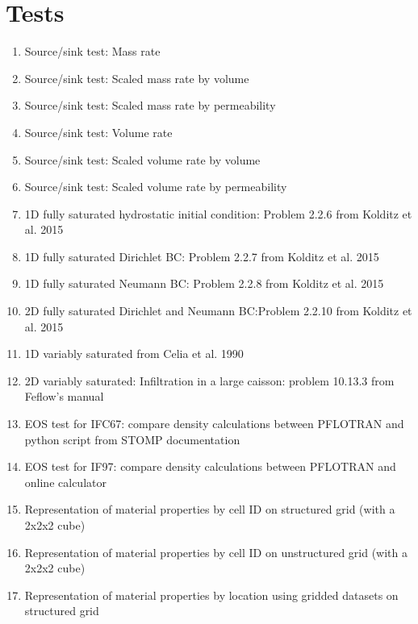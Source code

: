 \section{Tests}
\begin{enumerate}[label=Test \alph*.,ref=Test \alph*,nosep]
	\item \label{testMassRate} Source/sink test: Mass rate
	\item \label{testScaledMassRateVol} Source/sink test: Scaled mass rate by volume
	\item \label{testScaledMassRatePerm} Source/sink test: Scaled mass rate by permeability
	\item \label{testVolRate} Source/sink test: Volume rate
	\item \label{testScaledVolRateVol} Source/sink test: Scaled volume rate by volume
	\item \label{testScaledVolRatePerm} Source/sink test: Scaled volume rate by permeability
	\item \label{test1DSatHyd} 1D fully saturated hydrostatic initial condition: Problem 2.2.6 from Kolditz et al. 2015
	\item \label{test1DSatDirBC} 1D fully saturated Dirichlet BC: Problem 2.2.7 from Kolditz et al. 2015
	\item \label{test1DSatNeumBC} 1D fully saturated Neumann BC: Problem 2.2.8 from Kolditz et al. 2015
	\item \label{test2DSatDirNeumBC} 2D fully saturated Dirichlet and Neumann BC:Problem 2.2.10 from Kolditz et al. 2015
	\item \label{test1DVarSatCelia} 1D variably saturated from Celia et al. 1990
	\item \label{test2DVarSat} 2D variably saturated: Infiltration in a large caisson: problem 10.13.3 from Feflow's manual
	\item \label{testEOSIFC67} EOS test for IFC67: compare density calculations between PFLOTRAN and python script from STOMP documentation
	\item \label{testEOSIF97} EOS test for IF97: compare density calculations between PFLOTRAN and online calculator
	\item \label{testRepMatCellIDStruc} Representation of material properties by cell ID on structured grid (with a 2x2x2 cube)
	\item \label{testRepMatCellIDUnstruc} Representation of material properties by cell ID on unstructured grid (with a 2x2x2 cube)
	\item \label{testRepMatGridStruc} Representation of material properties by location using gridded datasets on structured grid

\end{enumerate}
